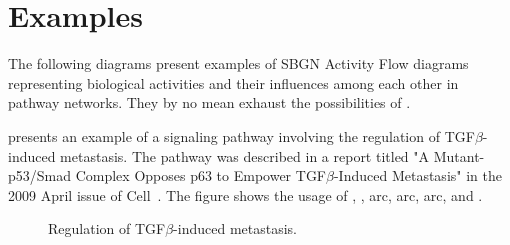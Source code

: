 
\chapter{Examples}
\label{af:example}


The following diagrams present examples of SBGN Activity Flow diagrams representing biological activities and their influences among each other in pathway networks.  They by no mean exhaust the possibilities of \SBGNAFLone.

 presents an example of a signaling pathway involving the regulation of TGF$\beta$-induced metastasis.  The pathway was described in a report titled "A Mutant-p53/Smad Complex Opposes p63 to Empower TGF$\beta$-Induced Metastasis" in the 2009 April issue of Cell~\cite{Adorno:2009}.  The figure shows the usage of , ,  arc,  arc,  arc, and .

\begin{figure}
\begin{center}
\caption{Regulation of TGF$\beta$-induced metastasis.}\label{fig:TGF}
\end{center}
\end{figure}

